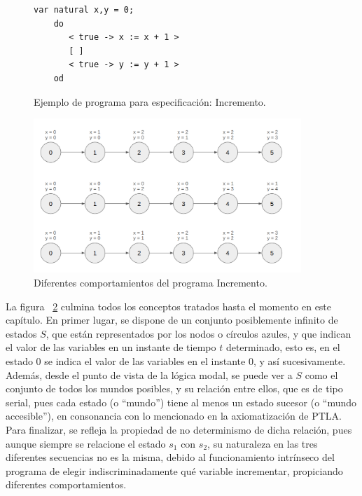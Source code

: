 \begin{figure}[ht]
\centering
\begin{lstlisting}[basicstyle=\ttfamily\small, frame=single]
    var natural x,y = 0;
    do 
       < true -> x := x + 1 >
       [ ]
       < true -> y := y + 1 >
    od
\end{lstlisting}
\caption{Ejemplo de programa para especificación: Incremento.}
\label{fig:TLAincrement}
\end{figure}

\begin{figure}[h]
    \centering
    \includegraphics[width=0.9\textwidth]{images/maths/ptla1.png}
    \caption{Diferentes comportamientos del programa Incremento.}
    \label{fig:TLAincrementBehav}
\end{figure}

La figura ~\ref{fig:TLAincrementBehav} culmina todos los conceptos tratados hasta el momento en este capítulo. En primer lugar, se dispone de un conjunto posiblemente infinito de estados $S$, que están representados por los nodos o círculos azules, y que indican el valor de las variables en un instante de tiempo $t$ determinado, esto es, en el estado 0 se indica el valor de las variables en el instante 0, y así sucesivamente. Además, desde el punto de vista de la lógica modal, se puede ver a $S$ como el conjunto de todos los mundos posibles, y su relación entre ellos, que es de tipo serial, pues cada estado (o ``mundo'') tiene al menos un estado sucesor (o ``mundo accesible''), en consonancia con lo mencionado en la axiomatización de PTLA. Para finalizar, se refleja la propiedad de no determinismo de dicha relación, pues aunque siempre se relacione el estado $s_1$ con $s_2$, su naturaleza en las tres diferentes secuencias no es la misma, debido al funcionamiento intrínseco del programa de elegir indiscriminadamente qué variable incrementar, propiciando diferentes comportamientos.

